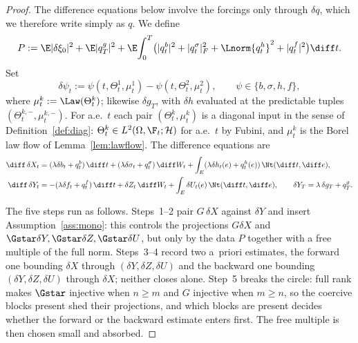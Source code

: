 \begin{proof}
The difference equations below involve the forcings only through $\delta q$, which we
therefore write simply as $q$. We define
\[
P:=\E|\delta\xi_0|^2+\E|q^g_T|^2
+\E\!\int_0^T\!\big(|q^b_t|^2+|q^\sigma_t|_F^2+\Lnorm{q^h_t}^2+|q^f_t|^2\big)\diff t .
\]
Set
\[
\delta\psi_t:=\psi(t,\Theta^1_t,\mu^1_t)-\psi(t,\Theta^2_t,\mu^2_t),\qquad
\psi\in\{b,\sigma,h,f\},
\]
where $\mu^k_t:=\Law(\Theta^k_t)$; likewise $\delta g_T$, with $\delta h$ evaluated at the
predictable tuples $(\Theta^{k,-}_t,\mu^{k,-}_t)$. For a.e.\ $t$ each pair
$(\Theta^k_t,\mu^k_t)$ is a diagonal input in the sense of Definition~\ref{def:diag}:
$\Theta^k_t\in L^2(\Omega,\F_t;\mathcal H)$ for a.e.\ $t$ by Fubini, and $\mu^k_t$ is
the Borel law flow of Lemma~\ref{lem:lawflow}.
The difference equations are
\begin{align}
\diff\,\delta X_t&=(\lambda\delta b_t+q^b_t)\,\diff t+(\lambda\delta\sigma_t+q^\sigma_t)\,\diff W_t
+\int_E(\lambda\delta h_t(e)+q^h_t(e))\,\Nt(\diff t,\diff e),\label{eq:dX}\\
\diff\,\delta Y_t&=-(\lambda\delta f_t+q^f_t)\,\diff t+\delta Z_t\,\diff W_t
+\int_E\delta U_t(e)\,\Nt(\diff t,\diff e),\qquad \delta Y_T=\lambda\,\delta g_T+q^g_T.\label{eq:dY}
\end{align}

The five steps run as follows. Steps~1--2 pair $G\,\delta X$ against $\delta Y$ and
insert Assumption~\ref{ass:mono}: this controls the projections $G\delta X$ and
$\Gstar\delta Y,\Gstar\delta Z,\Gstar\delta U$, but only by the data $P$ together with a
free multiple of the full norm. Steps~3--4 record two a~priori estimates, the forward one
bounding $\delta X$ through $(\delta Y,\delta Z,\delta U)$ and the backward one bounding
$(\delta Y,\delta Z,\delta U)$ through $\delta X$; neither closes alone.
Step~5 breaks the circle: full rank makes $\Gstar$ injective
when $n\ge m$ and $G$ injective when $m\ge n$, so the coercive blocks present shed their
projections, and which blocks are present decides whether the forward or the backward
estimate enters first. The free multiple is then chosen small and absorbed.


\end{proof}
